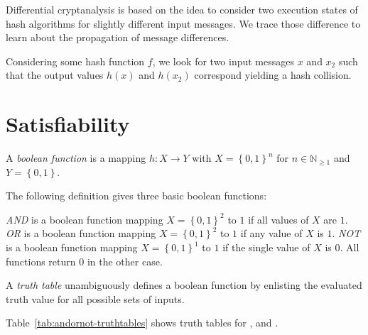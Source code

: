 Differential cryptanalysis is based on the idea to consider two execution states
of hash algorithms for slightly different input messages. We trace those difference
to learn about the propagation of message differences.

Considering some hash function $f$, we look for two input messages $x$ and $x_2$
such that the output values $h(x)$ and $h(x_2)$ correspond yielding a hash collision.



\section{Satisfiability}
\label{sec:intro-sat}
%
\begin{defi}
  A \emph{boolean function} is a mapping $h: X \to Y$ with $X = \left\{0,1\right\}^n$
  for $n \in \mathbb N_{\geq 1}$ and $Y = \left\{0,1\right\}$.
\end{defi}

The following definition gives three basic boolean functions:

\begin{defi}
  \emph{AND} is a boolean function mapping $X = \left\{0,1\right\}^2$
  to $1$ if all values of $X$ are $1$.
  \emph{OR} is a boolean function mapping $X = \left\{0,1\right\}^2$
  to $1$ if any value of $X$ is $1$.
  \emph{NOT} is a boolean function mapping $X = \left\{0,1\right\}^1$
  to $1$ if the single value of $X$ is $0$.
  All functions return $0$ in the other case.
\end{defi}

\begin{defi}
  A \emph{truth table} unambiguously defines a boolean function
  by enlisting the evaluated truth value for all possible sets of
  inputs.

  Table~\ref{tab:andornot-truthtables} shows truth tables for
  ,  and .
\end{defi}

